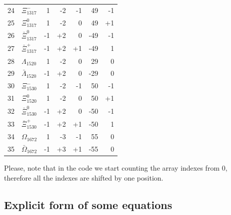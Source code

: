 \documentclass[12pt, a4paper]{article}
\begin{document}
\begin{small}
\begin{center}
\begin{tabular}{|l | l | r | r | r | r | r |}
        24 & $\Xi_{1317}^-$  &  1 & -2 &  -1 & 49&  -1\\
        25 & $\Xi_{1317}^0$  &  1 & -2 &   0 & 49&  +1\\
        26 & $\bar{\Xi}_{1317}^0$  &  -1 & +2 &   0 & -49&  -1\\
        27 & $\bar{\Xi}_{1317}^+$  &  -1 & +2 &  +1 & -49&   1\\
        28 & $\Lambda_{1520}$  &  1 & -2 &  0 & 29&   0\\
        29 & $\bar{\Lambda}_{1520}$  &  -1 & +2 &  0 & -29&   0\\
        30 & $\Xi_{1530}^-$  &  1 & -2 &  -1 & 50&  -1\\
        31 & $\Xi_{1520}^0$  &  1 & -2 &   0 & 50&  +1\\
        32 & $\bar{\Xi}_{1530}^0$  &  -1 & +2 &   0 & -50&  -1\\
        33 & $\bar{\Xi}_{1530}^+$  &  -1 & +2 &  +1 & -50&   1\\
        34 & $\Omega_{1672}$  &  1 & -3 &  -1 & 55&   0\\
        35 & $\bar{\Omega}_{1672}$  &  -1 & +3 &  +1 & -55&   0\\
	    
	    \hline
	 	 
	\end{tabular}
\end{center}
\end{small}
Please, note that in the code we start counting the array indexes from 0, therefore all the indexes are shifted by one position.

\subsection{Explicit form of some equations}
\end{document}
